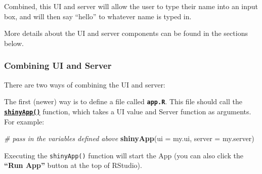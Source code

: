 \documentclass[]{book}
\newenvironment{Shaded}{\begin{snugshade}}{\end{snugshade}}
\newcommand{\KeywordTok}[1]{\textcolor[rgb]{0.13,0.29,0.53}{\textbf{#1}}}
\newcommand{\DataTypeTok}[1]{\textcolor[rgb]{0.13,0.29,0.53}{#1}}
\newcommand{\StringTok}[1]{\textcolor[rgb]{0.31,0.60,0.02}{#1}}
\newcommand{\CommentTok}[1]{\textcolor[rgb]{0.56,0.35,0.01}{\textit{#1}}}
\newcommand{\ControlFlowTok}[1]{\textcolor[rgb]{0.13,0.29,0.53}{\textbf{#1}}}
\newcommand{\OperatorTok}[1]{\textcolor[rgb]{0.81,0.36,0.00}{\textbf{#1}}}
\newcommand{\NormalTok}[1]{#1}
\theoremstyle{definition}
\theoremstyle{definition}
\theoremstyle{remark}
\begin{document}
\begin{enumerate}
\begin{Shaded}
\end{Shaded}
\end{enumerate}

Combined, this UI and server will allow the user to type their name into
an input box, and will then say ``hello'' to whatever name is typed in.

More details about the UI and server components can be found in the
sections below.

\subsubsection{Combining UI and Server}\label{combining-ui-and-server}

There are two ways of combining the UI and server:

The first (newer) way is to define a file called
\textbf{\texttt{app.R}}. This file should call the
\href{http://shiny.rstudio.com/reference/shiny/latest/shinyApp.html}{\textbf{\texttt{shinyApp()}}}
function, which takes a UI value and Server function as arguments. For
example:

\begin{Shaded}
\begin{Highlighting}[]
\CommentTok{# pass in the variables defined above}
\KeywordTok{shinyApp}\NormalTok{(}\DataTypeTok{ui =}\NormalTok{ my.ui, }\DataTypeTok{server =}\NormalTok{ my.server)}
\end{Highlighting}
\end{Shaded}

Executing the \texttt{shinyApp()} function will start the App (you can
also click the \textbf{``Run App''} button at the top of RStudio).
\end{document}
